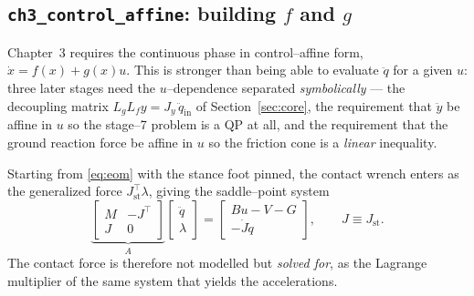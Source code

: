 \documentclass[11pt,a4paper]{article}
\newcommand{\code}[1]{\texttt{#1}}          %
\begin{document}
\subsection{\code{ch3\_control\_affine}: building $f$ and $g$}
Chapter~3 requires the continuous phase in control--affine form,
$\dot x = f(x) + g(x)u$. This is stronger than being able to evaluate $\ddot q$
for a given $u$: three later stages need the $u$--dependence separated
\emph{symbolically} --- the decoupling matrix $L_gL_f y = J_y\,\ddot q_{\text{in}}$
of Section~\ref{sec:core}, the requirement that $\ddot y$ be affine in $u$ so the
stage--7 problem is a QP at all, and the requirement that the ground reaction
force be affine in $u$ so the friction cone is a \emph{linear} inequality.

Starting from \eqref{eq:eom} with the stance foot pinned, the contact wrench
enters as the generalized force $J_{\mathrm{st}}^{\top}\lambda$, giving the
saddle--point system
\begin{equation}
  \underbrace{\begin{bmatrix} M & -J^{\top} \\ J & 0 \end{bmatrix}}_{A}
  \begin{bmatrix} \ddot q \\ \lambda \end{bmatrix}
  =
  \begin{bmatrix} Bu - V - G \\ -\dot J\dot q \end{bmatrix},
  \qquad J \equiv J_{\mathrm{st}}.
  \label{eq:kkt}
\end{equation}
The contact force is therefore not modelled but \emph{solved for}, as the
Lagrange multiplier of the same system that yields the accelerations.
\end{document}
